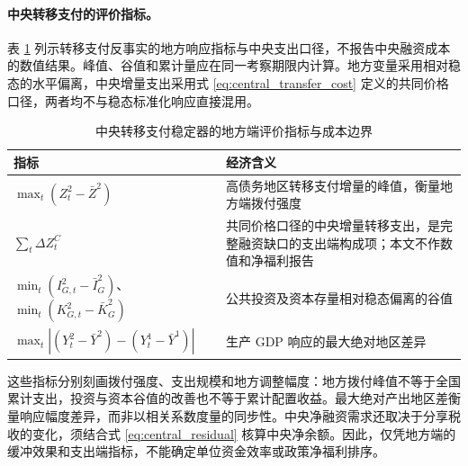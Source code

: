 \documentclass[12pt,UTF8]{ctexart}
\begin{document}
	\paragraph{中央转移支付的评价指标。}
	表 \ref{tab:central_transfer_cost} 列示转移支付反事实的地方响应指标与中央支出口径，不报告中央融资成本的数值结果。峰值、谷值和累计量应在同一考察期限内计算。地方变量采用相对稳态的水平偏离，中央增量支出采用式 \eqref{eq:central_transfer_cost} 定义的共同价格口径，两者均不与稳态标准化响应直接混用。
	
	\begin{table}[H]
		\centering
		\caption{中央转移支付稳定器的地方端评价指标与成本边界}
		\label{tab:central_transfer_cost}
		\small
		\begin{tabular}{p{}p{}}
			\toprule
			\textbf{指标} & \textbf{经济含义} \\
			\midrule
			$\max_t(Z_t^2-\bar Z^2)$ & 高债务地区转移支付增量的峰值，衡量地方端拨付强度 \\
			$\sum_t\Delta Z_t^C$ & 共同价格口径的中央增量转移支出，是完整融资缺口的支出端构成项；本文不作数值和净福利报告 \\
			$\min_t(I_{G,t}^2-\bar I_G^2)$、$\min_t(K_{G,t}^2-\bar K_G^2)$ & 公共投资及资本存量相对稳态偏离的谷值 \\
			$\max_t|(Y_t^2-\bar Y^2)-(Y_t^1-\bar Y^1)|$ & 生产 GDP 响应的最大绝对地区差异 \\
			\bottomrule
		\end{tabular}
	\end{table}
	
	这些指标分别刻画拨付强度、支出规模和地方调整幅度：地方拨付峰值不等于全国累计支出，投资与资本谷值的改善也不等于累计配置收益。最大绝对产出地区差衡量响应幅度差异，而非以相关系数度量的同步性。中央净融资需求还取决于分享税收的变化，须结合式 \eqref{eq:central_residual} 核算中央净余额。因此，仅凭地方端的缓冲效果和支出端指标，不能确定单位资金效率或政策净福利排序。
	
\end{document}
